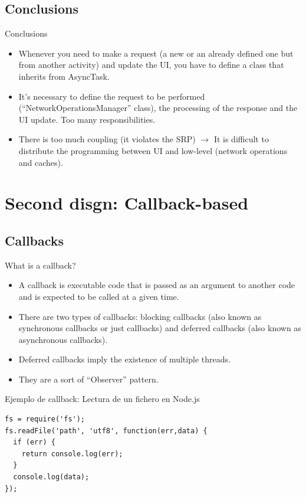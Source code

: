 \documentclass{beamer}
\begin{document}
\subsection{Conclusions}
\begin{frame}{Conclusions}
\begin{itemize}
\item Whenever you need to make a request (a new or an already defined one but from another activity) and update the UI, you have to define a class that inherits from AsyncTask.
\item It's necessary to define the request to be performed (``NetworkOperationsManager'' class), the processing of the response and the UI update. Too many responsibilities.
\item There is too much coupling (it violates the SRP) $\rightarrow$ It is difficult to distribute the programming between UI and low-level (network operations and caches).
\end{itemize}
\end{frame}

\section{Second disgn: Callback-based}
\subsection{Callbacks}
\begin{frame}{What is a callback?}
\begin{itemize}
\item A callback is executable code that is passed as an argument to another code and is expected to be called at a given time.
\item There are two types of callbacks: blocking callbacks (also known as synchronous callbacks or just callbacks) and deferred callbacks (also known as asynchronous callbacks).
\item Deferred callbacks imply the existence of multiple threads.
\item They are a sort of ``Observer'' pattern.
\end{itemize}
\end{frame}

\begin{frame}[fragile]{Ejemplo de callback: Lectura de un fichero en Node.js}
\begin{lstlisting}
fs = require('fs');
fs.readFile('path', 'utf8', function(err,data) {
  if (err) {
    return console.log(err);
  }
  console.log(data);
});
\end{lstlisting}


\end{frame}
\end{document}
